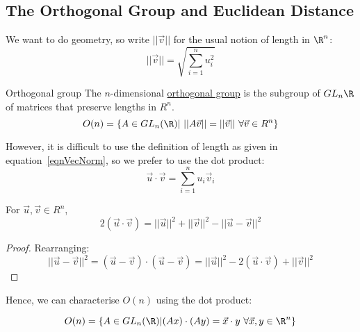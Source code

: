\documentclass[../Main.tex]{subfiles}
\begin{document}
\subsection{The Orthogonal Group and Euclidean Distance}
We want to do geometry, so write $||\vec{v}||$ for the usual notion of length in $\R^n$:
\begin{equation}
    ||\vec{v}|| = \sqrt{\sum_{i=1}^{n}u_i^2}
    \label{eqnVecNorm}
\end{equation}
\begin{definition}{Orthogonal group}
    The $n$-dimensional \underline{orthogonal group} is the subgroup of $GL_n{\R}$ of matrices that preserve lengths in $R^n$.
    \begin{equation*}
        O(n) = \{A \in GL_n(\R) |~||A\vec{v}|| = ||\vec{v}||~\forall \vec{v} \in R^n\}
    \end{equation*}
\end{definition}
However, it is difficult to use the definition of length as given in equation~\ref{eqnVecNorm}, so we prefer to use the dot product:
\begin{equation}
    \vec{u} \cdot \vec{v} = \sum_{i=1}^{n}u_i \vec{v}_i
    \label{eqnDotProduct}
\end{equation}
\begin{lemma}
    \label{lemPolarisation}
    For $\vec{u}, \vec{v} \in R^n$,
    \begin{equation*}
        2(\vec{u} \cdot \vec{v}) = ||\vec{u}||^2 + ||\vec{v}||^2 - ||\vec{u} - \vec{v}||^2
    \end{equation*}
\end{lemma}
\begin{proof}
    Rearranging:
    \begin{equation*}
        ||\vec{u}-\vec{v}||^2 = (\vec{u}-\vec{v}) \cdot (\vec{u}-\vec{v}) = ||\vec{u}||^2 - 2 (\vec{u} \cdot \vec{v}) + ||\vec{v}||^2
    \end{equation*}
\end{proof}
Hence, we can characterise $O(n)$ using the dot product:
\begin{lemma}
    \begin{equation*}
        O(n) = \{A \in GL_n(\R) | (Ax) \cdot (Ay) = \vec{x} \cdot y~\forall \vec{x}, y \in \R^n\}
    \end{equation*}
    \label{lemDotProdOrthoGrp}
\end{lemma}
\end{document}
